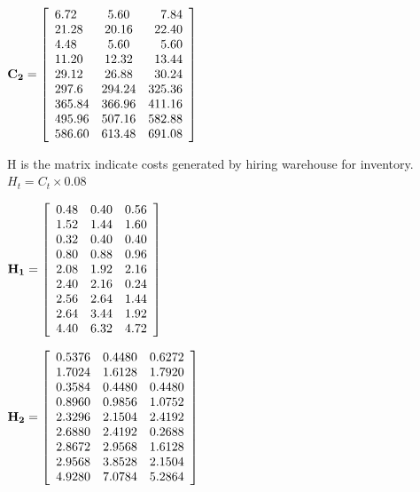 \documentclass[12pt]{article}
\begin{document}
\begin{center}
$\mathbf{C_2} =  
\left[
\begin{array}{l c r}
6.72 &5.60 &7.84 \\
21.28 &20.16 &22.40 \\
4.48 &5.60 &5.60 \\
11.20 &12.32 &13.44 \\
29.12 &26.88 &30.24 \\
297.6 &294.24 &325.36 \\
365.84 &366.96 &411.16 \\
495.96 &507.16 &582.88 \\
586.60 &613.48 &691.08

\end{array}
\right]
$
\end{center}
\noindent
H is the matrix indicate costs generated by hiring warehouse for inventory.
\\$H_t= C_t\times0.08$
\begin{center}
$\mathbf{H_1} =  
\left[
\begin{array}{l c r}
0.48 &0.40 &0.56 \\
1.52 &1.44 &1.60 \\
0.32 &0.40 &0.40 \\
0.80 &0.88 &0.96 \\
2.08 &1.92 &2.16 \\
2.40 &2.16 &0.24 \\
2.56 &2.64 &1.44 \\
2.64 &3.44 &1.92 \\
4.40 &6.32 &4.72 
\end{array}
\right]
$
\end{center}

\begin{center}
$\mathbf{H_2} =  
\left[
\begin{array}{l c r}
0.5376 &0.4480 &0.6272 \\
1.7024 &1.6128 &1.7920 \\
0.3584 &0.4480 &0.4480 \\
0.8960 &0.9856 &1.0752 \\
2.3296 &2.1504 &2.4192 \\
2.6880 &2.4192 &0.2688 \\
2.8672 &2.9568 &1.6128 \\
2.9568 &3.8528 &2.1504 \\
4.9280 &7.0784 &5.2864 
\end{array}
\right]
$
\end{center}
\end{document}
